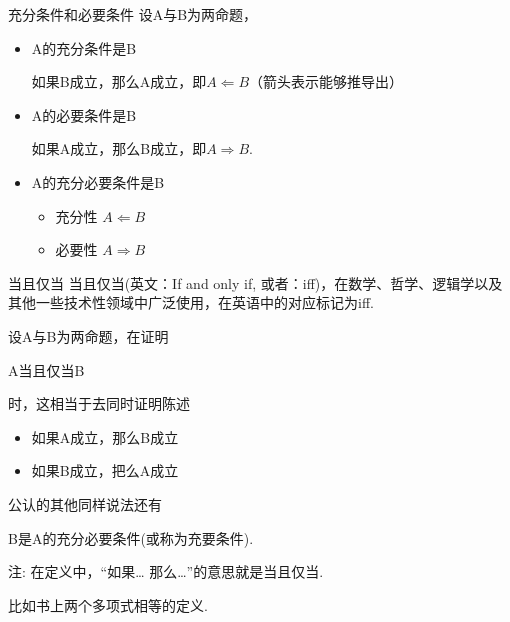 \documentclass[11pt,punct]{ctexbeamer}
\begin{document}
\begin{frame}{充分条件和必要条件}
设A与B为两命题，
\begin{itemize}
	\item A的\alert{充分条件}是B

	如果B成立，那么A成立，即$A\Leftarrow B$（箭头表示能够推导出）

	\item A的\alert{必要条件}是B

	如果A成立，那么B成立，即$A\Rightarrow B$.

	\item A的\alert{充分必要条件}是B
	\begin{itemize}
		\item 充分性 $A\Leftarrow B$
		\item 必要性 $A\Rightarrow B$
	\end{itemize}

\end{itemize}


\end{frame}
\begin{frame}{当且仅当}
当且仅当(英文：If and only if, 或者：iff)，在数学、哲学、逻辑学以及其他一些技术性领域中广泛使用，在英语中的对应标记为iff.

设A与B为两命题，在证明
\begin{center}
A当且仅当B
\end{center}
时，这相当于去同时证明陈述
\begin{itemize}
\item 如果A成立，那么B成立
\item 如果B成立，把么A成立
\end{itemize}



公认的其他同样说法还有
\begin{center}
B是A的充分必要条件(或称为充要条件).
\end{center}
%
%
%
%
注: 在定义中，``如果… \quad 那么…''的意思就是当且仅当.

比如书上两个多项式相等的定义.
\end{frame}
\end{document}

